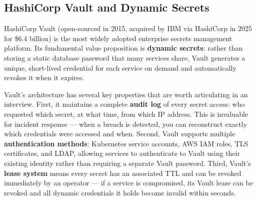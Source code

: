 \documentclass[11pt,a4paper]{article}
\begin{document}
\subsection{HashiCorp Vault and Dynamic Secrets}

HashiCorp Vault (open-sourced in 2015, acquired by IBM via HashiCorp in 2025 for \$6.4 billion) is the most widely adopted enterprise secrets management platform. Its fundamental value proposition is \textbf{dynamic secrets}: rather than storing a static database password that many services share, Vault generates a unique, short-lived credential for each service on demand and automatically revokes it when it expires.

Vault's architecture has several key properties that are worth articulating in an interview. First, it maintains a complete \textbf{audit log} of every secret access: who requested which secret, at what time, from which IP address. This is invaluable for incident response --- when a breach is detected, you can reconstruct exactly which credentials were accessed and when. Second, Vault supports multiple \textbf{authentication methods}: Kubernetes service accounts, AWS IAM roles, TLS certificates, and LDAP, allowing services to authenticate to Vault using their existing identity rather than requiring a separate Vault password. Third, Vault's \textbf{lease system} means every secret has an associated TTL and can be revoked immediately by an operator --- if a service is compromised, its Vault lease can be revoked and all dynamic credentials it holds become invalid within seconds.
\end{document}
